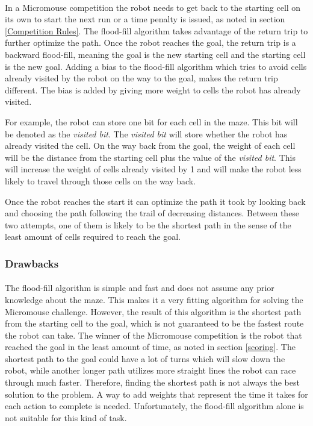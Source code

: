 \documentclass[12pt]{article}
\begin{document}
\paragraph{}
In a \gls{Micromouse} competition the robot needs to get back to the starting \gls{cell} on its own to start the next run or a time penalty is issued, as noted in section \ref{Competition Rules}.
The flood-fill algorithm takes advantage of the return trip to further optimize the path.
Once the robot reaches the goal, the return trip is a backward flood-fill, meaning the goal is the new starting \gls{cell} and the starting \gls{cell} is the new goal.
Adding a bias to the flood-fill algorithm which tries to avoid \gls{cell}s already visited by the robot on the way to the goal, makes the return trip different.
The bias is added by giving more weight to \gls{cell}s the robot has already visited.

For example, the robot can store one bit for each \gls{cell} in the \gls{maze}.
This bit will be denoted as the \textit{visited bit}.
The \textit{visited bit} will store whether the robot has already visited the \gls{cell}.
On the way back from the goal, the weight of each \gls{cell} will be the distance from the starting \gls{cell} plus the value of the \textit{visited bit}.
This will increase the weight of \gls{cell}s already visited by 1 and will make the robot less likely to travel through those \gls{cell}s on the way back.

Once the robot reaches the start it can optimize the path it took by looking back and choosing the path following the trail of decreasing distances.
Between these two attempts, one of them is likely to be the shortest path in the sense of the least amount of \gls{cell}s required to reach the goal.

\subsubsection{Drawbacks} \label{Flood-fill drawbacks}
\paragraph{}
The flood-fill algorithm is simple and fast and does not assume any prior knowledge about the \gls{maze}.
This makes it a very fitting algorithm for solving the \gls{Micromouse} challenge.
However, the result of this algorithm is the shortest path from the starting \gls{cell} to the goal, which is not guaranteed to be the fastest route the robot can take.
The winner of the \gls{Micromouse} competition is the robot that reached the goal in the least amount of time, as noted in section \ref{scoring}.
The shortest path to the goal could have a lot of turns which will slow down the robot, while another longer path utilizes more straight lines the robot can race through much faster.
Therefore, finding the shortest path is not always the best solution to the problem.
A way to add weights that represent the time it takes for each action to complete is needed.
Unfortunately, the flood-fill algorithm alone is not suitable for this kind of task.
\end{document}
